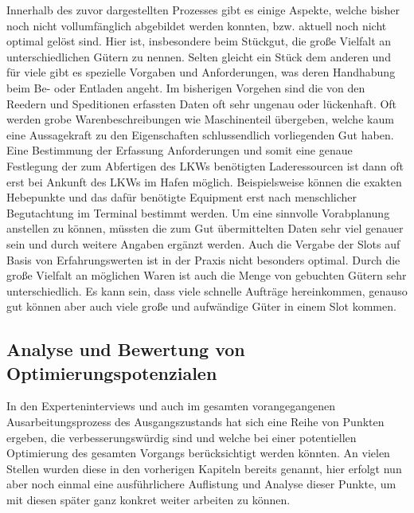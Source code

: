Innerhalb des zuvor dargestellten Prozesses gibt es einige Aspekte, welche bisher noch nicht vollumfänglich abgebildet werden konnten, bzw. aktuell noch nicht optimal gelöst sind. Hier ist, insbesondere beim Stückgut, die große Vielfalt an unterschiedlichen Gütern zu nennen. Selten gleicht ein Stück dem anderen und für viele gibt es spezielle Vorgaben und Anforderungen, was deren Handhabung beim Be- oder Entladen angeht. Im bisherigen Vorgehen sind die von den Reedern und Speditionen erfassten Daten oft sehr ungenau oder lückenhaft. Oft werden grobe Warenbeschreibungen wie \glqq{}Maschinenteil\grqq{} übergeben, welche kaum eine Aussagekraft zu den Eigenschaften schlussendlich vorliegenden Gut haben. Eine Bestimmung der Erfassung Anforderungen und somit eine genaue Festlegung der zum Abfertigen des LKWs benötigten Laderessourcen ist dann oft erst bei Ankunft des LKWs im Hafen möglich. Beispielsweise können die exakten Hebepunkte und das dafür benötigte Equipment erst nach menschlicher Begutachtung im Terminal bestimmt werden. Um eine sinnvolle Vorabplanung anstellen zu können, müssten die zum Gut übermittelten Daten sehr viel genauer sein und durch weitere Angaben ergänzt werden. Auch die Vergabe der Slots auf Basis von Erfahrungswerten ist in der Praxis nicht besonders optimal. Durch die große Vielfalt an möglichen Waren ist auch die Menge von gebuchten Gütern sehr unterschiedlich. Es kann sein, dass viele schnelle Aufträge hereinkommen, genauso gut können aber auch viele große und aufwändige Güter in einem Slot kommen.


\subsection{Analyse und Bewertung von Optimierungspotenzialen}
\label{sec:analyseOptimierungspotenziale}



In den Experteninterviews und auch im gesamten vorangegangenen Ausarbeitungsprozess des Ausgangszustands hat sich eine Reihe von Punkten ergeben, die verbesserungswürdig sind und welche bei einer potentiellen Optimierung des gesamten Vorgangs berücksichtigt werden könnten. An vielen Stellen wurden diese in den vorherigen Kapiteln bereits genannt, hier erfolgt nun aber noch einmal eine ausführlichere Auflistung und Analyse dieser Punkte, um mit diesen später ganz konkret weiter arbeiten zu können.

